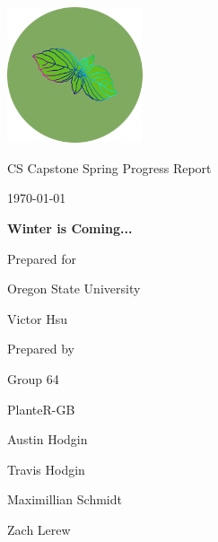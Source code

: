 \documentclass[onecolumn, draftclsnofoot,10pt, compsoc]{IEEEtran}
\def \CapstoneTeamName{			              			 PlanteR-GB}
\def \CapstoneTeamNumber{					           			 Group 64}
\def \GroupMemberOne{				           				Austin Hodgin}
\def \GroupMemberTwo{				           				Travis Hodgin}
\def \GroupMemberThree{			            Maximillian Schmidt}
\def\GroupMemberFour{		        	               Zach Lerew}
\def \CapstoneProjectName{	      	    Winter is Coming...}
\def \CapstoneSponsorCompany{		    Oregon State University}
\def \CapstoneSponsorPerson{		 			  				 Victor Hsu}
\def \DocType{		%
				Spring Progress Report
				}
\newcommand{\NameSigPair}[1]{\par
\makebox[2.75in][r]{#1} \hfil 	\makebox[3.25in]{\makebox[2.25in]{\hrulefill} \hfill		\makebox[.75in]{\hrulefill}}
\par\vspace{-12pt} \textit{\tiny\noindent
\makebox[2.75in]{} \hfil		\makebox[3.25in]{\makebox[2.25in][r]{Signature} \hfill	\makebox[.75in][r]{Date}}}}
\renewcommand{\NameSigPair}[1]{#1}
\begin{document}
\begin{titlepage}
    \begin{singlespace}
        \hfill

        \includegraphics[height=4cm]{logo.png}

        \par\vspace{.2in}
        \centering
        \scshape{
            \huge CS Capstone \DocType \par
            {\large\today}\par
            \vspace{.5in}
            \textbf{\Huge\CapstoneProjectName}\par

						\vspace{1in}

            {\large Prepared for}\par
            \Huge \CapstoneSponsorCompany\par
            \vspace{5pt}
            {\Large\NameSigPair{\CapstoneSponsorPerson}\par}

						\vspace{1in}

            {\large Prepared by}\par
						{\huge \CapstoneTeamNumber}\par
            \CapstoneTeamName\par
            \vspace{5pt}

            {
							\Large
							\NameSigPair{\GroupMemberOne}\par
							\NameSigPair{\GroupMemberTwo}\par
							\NameSigPair{\GroupMemberThree}\par
							\NameSigPair{\GroupMemberFour}\par
            }

            \vspace{20pt}
        }
				\newpage
        \begin{abstract}
				\noindent This document details what the team has accomplished for the final stage of the project.
				It covers the progress made on the bug fixing and polishing portion of the project,
				as well as problems we faced and the solutions implemented.
        \end{abstract}
    \end{singlespace}
\end{titlepage}
\end{document}
